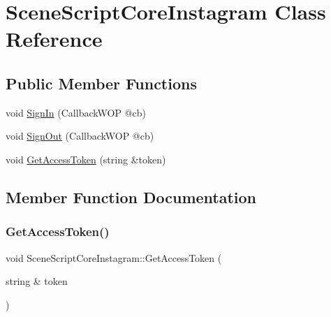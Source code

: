 \hypertarget{class_scene_script_core_instagram}{}\section{Scene\+Script\+Core\+Instagram Class Reference}
\label{class_scene_script_core_instagram}
\subsection*{Public Member Functions}
\begin{DoxyCompactItemize}
\item 
void \hyperlink{class_scene_script_core_instagram_a1bc05430f2528edc33971349ca1a06cd}{Sign\+In} (Callback\+W\+OP @cb)
\item 
void \hyperlink{class_scene_script_core_instagram_a9832fc23c00864bd59151ea9d3128a68}{Sign\+Out} (Callback\+W\+OP @cb)
\item 
void \hyperlink{class_scene_script_core_instagram_a6ee01dbfc2e2904f369d0dd054ee15da}{Get\+Access\+Token} (string \&token)
\end{DoxyCompactItemize}


\subsection{Member Function Documentation}
\hypertarget{class_scene_script_core_instagram_a6ee01dbfc2e2904f369d0dd054ee15da}{}\label{class_scene_script_core_instagram_a6ee01dbfc2e2904f369d0dd054ee15da} 
\subsubsection{\texorpdfstring{Get\+Access\+Token()}{GetAccessToken()}}
{\footnotesize\ttfamily void Scene\+Script\+Core\+Instagram\+::\+Get\+Access\+Token (\begin{DoxyParamCaption}\item[{string \&}]{token }\end{DoxyParamCaption})}

\hypertarget{class_scene_script_core_instagram_a1bc05430f2528edc33971349ca1a06cd}{}\label{class_scene_script_core_instagram_a1bc05430f2528edc33971349ca1a06cd} 
